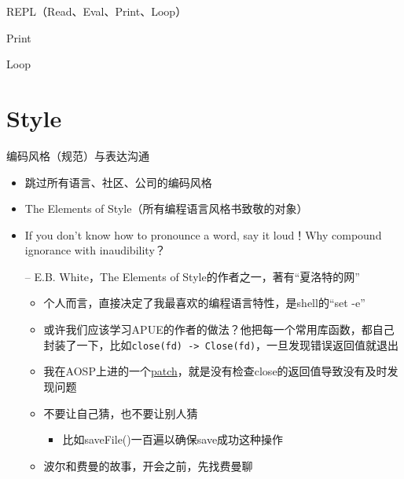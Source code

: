 \documentclass[presentation,dvipdfmx,CJKbookmarks]{beamer}
\begin{document}
\begin{CJK*}{UTF8}{simsun}
\begin{frame}[label={sec:orgedc3c81}]{REPL（Read、Eval、Print、Loop）}
\begin{block}{Print}
\end{block}
\begin{block}{Loop}
\end{block}
\end{frame}

\section{Style}
\label{sec:org7fd2dd7}

\begin{frame}[fragile,label={sec:orgc3738dc}]{编码风格（规范）与表达沟通}
 \begin{itemize}
\item 跳过所有语言、社区、公司的编码风格
\item The Elements of Style（所有编程语言风格书致敬的对象）
\item If you don't know how to pronounce a word, say it loud！Why compound ignorance with inaudibility？

-- E.B. White，The Elements of Style\thinspace 的作者之一，著有“夏洛特的网”

\begin{itemize}
\item 个人而言，直接决定了我最喜欢的编程语言特性，是\thinspace shell\thinspace 的“set -e”
\item 或许我们应该学习\thinspace APUE\thinspace 的作者的做法？他把每一个常用库函数，都自己封装了一下，比如\thinspace \texttt{close(fd) -> Close(fd)}，一旦发现错误返回值就退出
\item 我在\thinspace AOSP\thinspace 上进的一个\thinspace \href{https://android.googlesource.com/platform/frameworks/av/+/5225ba0\%255E\%2521/\#F1}{patch}，就是没有检查\thinspace close\thinspace 的返回值导致没有及时发现问题
\item 不要让自己猜，也不要让别人猜
\begin{itemize}
\item 比如\thinspace saveFile()\thinspace 一百遍以确保\thinspace save\thinspace 成功这种操作
\end{itemize}
\item 波尔和费曼的故事，开会之前，先找费曼聊
\end{itemize}
\end{itemize}
\end{frame}


\end{CJK*}
\end{document}
